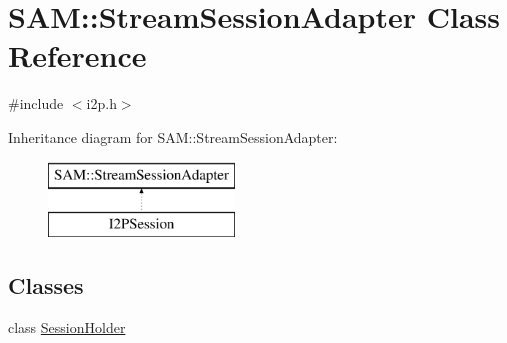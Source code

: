 \hypertarget{class_s_a_m_1_1_stream_session_adapter}{}\section{S\+A\+M\+:\+:Stream\+Session\+Adapter Class Reference}
\label{class_s_a_m_1_1_stream_session_adapter}


{\ttfamily \#include $<$i2p.\+h$>$}

Inheritance diagram for S\+A\+M\+:\+:Stream\+Session\+Adapter\+:\begin{figure}[H]
\begin{center}
\leavevmode
\includegraphics[height=2.000000cm]{class_s_a_m_1_1_stream_session_adapter}
\end{center}
\end{figure}
\subsection*{Classes}
\begin{DoxyCompactItemize}
\item 
class \hyperlink{class_s_a_m_1_1_stream_session_adapter_1_1_session_holder}{Session\+Holder}
\end{DoxyCompactItemize}
